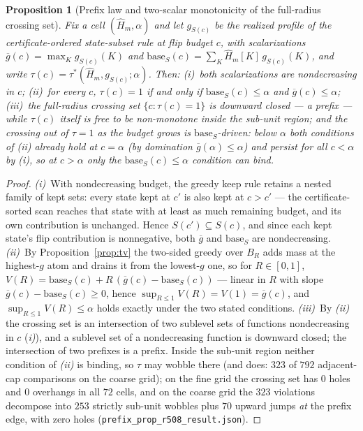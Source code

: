 \documentclass{article}
\newtheorem{proposition}{Proposition}
\theoremstyle{definition}
\theoremstyle{remark}
\begin{document}
\begin{proposition}[Prefix law and two-scalar monotonicity of the
full-radius crossing set]
\label{prop:prefix}
Fix a cell $(\widehat H_m, \alpha)$ and let $g_{S(c)}$ be the realized
profile of the certificate-ordered state-subset rule at flip budget
$c$, with scalarizations $\overline g(c)=\max_K g_{S(c)}(K)$ and
$\mathrm{base}_S(c)=\sum_K \widehat H_m[K]\,g_{S(c)}(K)$, and write
$\tau(c)=\tau^*(\widehat H_m, g_{S(c)}; \alpha)$. Then:
\emph{(i)}~both scalarizations are nondecreasing in $c$;
\emph{(ii)}~for every $c$, $\tau(c)=1$ if and only if
$\mathrm{base}_S(c)\le\alpha$ and $\overline g(c)\le\alpha$;
\emph{(iii)}~the full-radius crossing set $\{c:\tau(c)=1\}$ is downward
closed --- a prefix --- while $\tau(c)$ itself is free to be
non-monotone inside the sub-unit region; and the crossing out of
$\tau{=}1$ as the budget grows is $\mathrm{base}_S$-driven: below
$\alpha$ both conditions of \emph{(ii)} already hold at $c=\alpha$ (by
domination $\overline g(\alpha)\le\alpha$) and persist for all
$c<\alpha$ by \emph{(i)}, so at $c>\alpha$ only the
$\mathrm{base}_S(c)\le\alpha$ condition can bind.
\end{proposition}
\begin{proof}
\emph{(i)}~With nondecreasing budget, the greedy keep rule retains a
nested family of kept sets: every state kept at $c'$ is also kept at
$c>c'$ --- the certificate-sorted scan reaches that state with at least
as much remaining budget, and its own contribution is unchanged. Hence
$S(c')\subseteq S(c)$, and since each kept state's flip contribution is
nonnegative, both $\overline g$ and $\mathrm{base}_S$ are nondecreasing.
\emph{(ii)}~By Proposition~\ref{prop:tv} the two-sided greedy over
$B_R$ adds mass at the highest-$g$ atom and drains it from the
lowest-$g$ one, so for $R\in[0,1]$,
$V(R)=\mathrm{base}_S(c)+R\,(\overline g(c)-\mathrm{base}_S(c))$ ---
linear in $R$ with slope $\overline g(c)-\mathrm{base}_S(c)\ge0$, hence
$\sup_{R\le1}V(R)=V(1)=\overline g(c)$, and
$\sup_{R\le1}V(R)\le\alpha$ holds exactly under the two stated
conditions. \emph{(iii)}~By \emph{(ii)} the crossing set is an
intersection of two sublevel sets of functions nondecreasing in $c$
(\emph{i)}), and a sublevel set of a nondecreasing function is downward
closed; the intersection of two prefixes is a prefix. Inside the
sub-unit region neither condition of \emph{(ii)} is binding, so $\tau$
may wobble there (and does: $323$ of $792$ adjacent-cap comparisons on
the coarse grid); on the fine grid the crossing set has $0$ holes and
$0$ overhangs in all $72$ cells, and on the coarse grid the $323$
violations decompose into $253$ strictly sub-unit wobbles plus $70$
upward jumps \emph{at} the prefix edge, with zero holes
(\texttt{prefix\_prop\_r508\_result.json}).
\end{proof}
\end{document}
